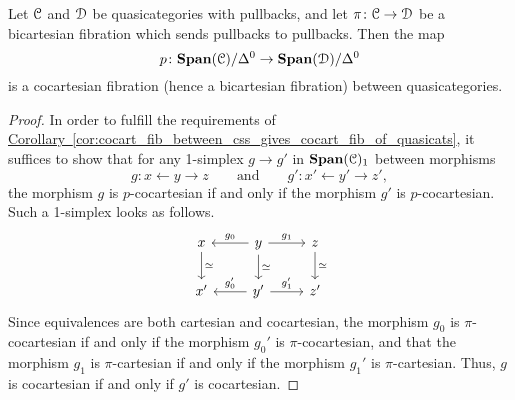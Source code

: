\documentclass[main.tex]{subfiles}
\begin{document}
\begin{theorem}
  Let $\mathcal{C}$ and $\mathcal{D}$ be quasicategories with pullbacks, and let $\pi\colon \mathcal{C} \to \mathcal{D}$ be a bicartesian fibration which sends pullbacks to pullbacks. Then the map
  \begin{equation*}
    p\colon \mathbf{Span}(\mathcal{C})/\Delta^{0} \to \mathbf{Span}(\mathcal{D})/\Delta^{0}
  \end{equation*}
  is a cocartesian fibration (hence a bicartesian fibration) between quasicategories.
\end{theorem}
\begin{proof}
  In order to fulfill the requirements of \hyperref[cor:cocart_fib_between_css_gives_cocart_fib_of_quasicats]{Corollary~\ref*{cor:cocart_fib_between_css_gives_cocart_fib_of_quasicats}}, it suffices to show that for any 1-simplex $g \to g'$ in $\mathbf{Span}(\mathcal{C})_{1}$ between morphisms
  \begin{equation*}
    g\colon x \leftarrow y \to z \qquad\text{and}\qquad g'\colon x' \leftarrow y' \to z',
  \end{equation*}
  the morphism $g$ is $p$-cocartesian if and only if the morphism $g'$ is $p$-cocartesian. Such a 1-simplex looks as follows.
  \begin{equation*}
    \begin{tikzcd}
      x
      \arrow[d, "\simeq"]
      & y
      \arrow[l, swap, "g_{0}"]
      \arrow[r, "g_{1}"]
      \arrow[d, "\simeq"]
      & z
      \arrow[d, "\simeq"]
      \\
      x'
      & y'
      \arrow[l, swap, "g'_{0}"]
      \arrow[r, "g'_{1}"]
      & z'
    \end{tikzcd}
  \end{equation*}
  Since equivalences are both cartesian and cocartesian, the morphism $g_{0}$ is $\pi$-cocartesian if and only if the morphism $g_{0}'$ is $\pi$-cocartesian, and that the morphism $g_{1}$ is $\pi$-cartesian if and only if the morphism $g_{1}'$ is $\pi$-cartesian. Thus, $g$ is cocartesian if and only if $g'$ is cocartesian.
\end{proof}
\end{document}
